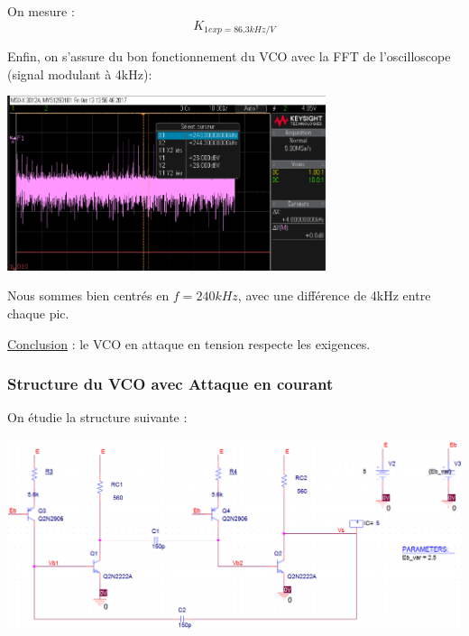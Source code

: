 \documentclass[a4paper]{report}
\begin{document}
On mesure : 
$$ K_{1exp = 86.3kHz/V} $$

Enfin, on s'assure du bon fonctionnement du VCO avec la FFT de l'oscilloscope (signal modulant à 4kHz): 

\begin{center}
\includegraphics[width=0.7\textwidth]{fft_vco.PNG}
\end{center}

Nous sommes bien centrés en $f = 240 kHz$, avec une différence de 4kHz entre chaque pic.

\underline{Conclusion} : le VCO en attaque en tension respecte les exigences.
\newpage
\subsubsection{Structure du VCO avec Attaque en courant}

On étudie la structure suivante :

\begin{center}
\includegraphics[width=1\textwidth]{VCOI.PNG}
\end{center}
\end{document}

